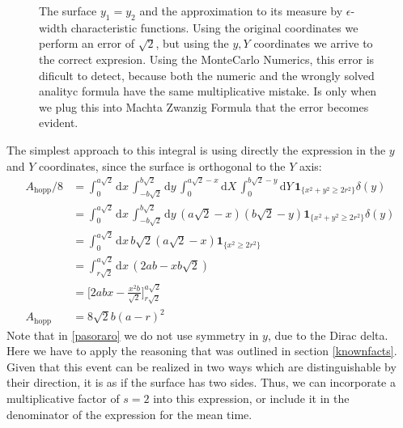 \documentclass[superscriptaddress,pre,reprint,showpacs,twocolumn]{revtex4-1}
\newcommand{\rd}[1]{\mathrm{d}{#1} \,}
\newcommand{\indicatorsymbol}{\mathbf{1}}
\newcommand{\indicator}[1]{\indicatorsymbol_{ \{   #1 \} } }
\begin{document}
\begin{figure}
\caption{The surface $y_1=y_2$ and the approximation to its measure by
  $\epsilon$-width characteristic functions. Using the original coordinates
  we perform an error of $\sqrt{2}$, but using the $y,Y$ coordinates
  we arrive to the correct expresion. Using the MonteCarlo Numerics, this
  error is dificult to detect, because both the numeric and the wrongly solved
  analityc formula have the same multiplicative mistake. Is only when we plug this into
Machta Zwanzig Formula that the error becomes evident. }\label{DiagramaDelta01}
\end{figure}

The simplest approach to this integral is using directly the expression in the $y$ and $Y$
coordinates, since the surface is orthogonal to the $Y$ axis:
  \begin{align}
    A_\text{hopp}/8 & = \int_0^{a\sqrt{2}} \rd x  \int_{-b\sqrt{2}}^{b \sqrt{2}} \rd y
    \int_0^{a\sqrt{2}-x} \rd X  \int_0^{b \sqrt{2}-y} \rd Y
    \indicator{x^2+y^2 \geq 2 r^2} \delta (y) \label{pasoraro} \\
    &=  \int_0^{a\sqrt{2}} \rd x  \int_{-b\sqrt{2}}^{b \sqrt{2}} \rd y
    (a\sqrt{2}-x)(b\sqrt{2}-y)
    \indicator{x^2+y^2 \geq 2 r^2} \delta (y)\\
    &= \int_0^{a\sqrt{2}} \rd x b\sqrt{2} (a\sqrt{2}-x)
    \indicator{x^2\geq 2 r^2} \\
    &= \int_{r\sqrt{2}}^{a\sqrt{2}} \rd x
    (2ab-xb\sqrt{2})\\
    &=\biggl[2abx-\frac{x^2b}{\sqrt{2}} \biggr]_{r\sqrt{2}}^{a\sqrt{2}}\\
      A_\text{hopp}&=8\sqrt{2}b(a-r)^2
  \end{align}
  Note that in \eqref{pasoraro} we do not use symmetry in
  $y$, due to the Dirac delta.
  Here we have to apply the reasoning that was outlined in section \ref{knownfacts}.
  Given that this event can be realized in two ways which are
  distinguishable by their direction, it is as if the surface has two sides.
  Thus, we can incorporate a multiplicative factor of $s=2$ into this expression, or include it in the denominator of 
  the expression for the mean time.
\end{document}
